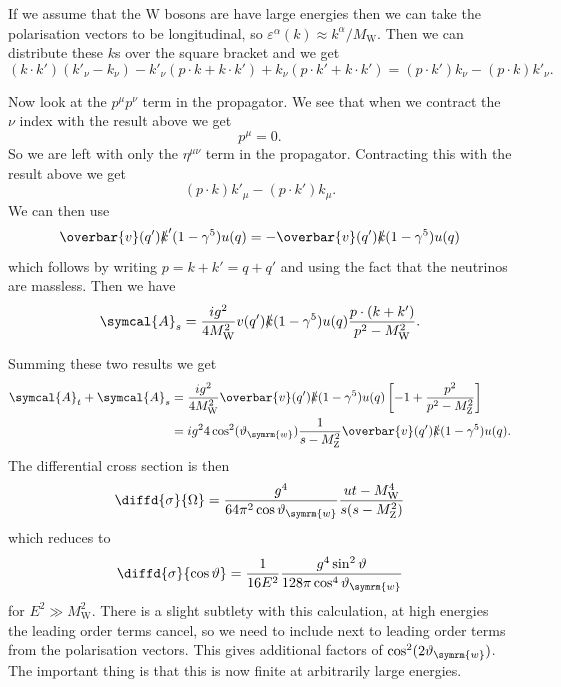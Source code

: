 \documentclass[fleqn]{NotesClass}
\newcommand{\Pparticle}[1]{\mathrm{#1}}
\newcommand{\PZ}{\ensuremath{\Pparticle{Z}}}
\newcommand{\PW}{\ensuremath{\Pparticle{W}}}
\newcommand{\diracadjoint}[1]{\overbar{#1}}
\newcommand{\amplitude}{\symcal{A}}
\newcommand{\minkowskiMetric}{\eta}
\newcommand{\weinbergangle}{\vartheta_{\symrm{w}}}
\begin{document}
    If we assume that the \PW{} bosons are have large energies then we can take the polarisation vectors to be longitudinal, so \(\varepsilon^\alpha(k) \approx k^\alpha/M_{\PW}\).
    Then we can distribute these \(k\)s over the square bracket and we get
    \begin{equation}
        (k \cdot k')(k'_\nu - k_\nu) - k'_\nu(p \cdot k + k \cdot k') + k_\nu(p \cdot k' + k \cdot k') = (p \cdot k')k_\nu - (p \cdot k)k'_\nu.
    \end{equation}
    
    Now look at the \(p^\mu p^\nu\) term in the propagator.
    We see that when we contract the \(\nu\) index with the result above we get
    \begin{equation}
        [(p \cdot k')(k \cdot p) - (p \cdot k)(k' \cdot p)]p^\mu = 0.
    \end{equation}
    So we are left with only the \(\minkowskiMetric^{\mu\nu}\) term in the propagator.
    Contracting this with the result above we get
    \begin{equation}
        (p \cdot k)k'_\mu - (p\cdot k')k_\mu.
    \end{equation}
    We can then use
    \begin{equation}
        \diracadjoint{v}(q')\slashed{k}'(1 - \gamma^5)u(q) = -\diracadjoint{v}(q')\slashed{k}(1 - \gamma^5)u(q)
    \end{equation}
    which follows by writing \(p = k + k' = q + q'\) and using the fact that the neutrinos are massless.
    Then we have
    \begin{equation}
        \amplitude_s = \frac{ig^2}{4M_{\PW}^2} v(q')\slashed{k}(1 - \gamma^5)u(q) \frac{p \cdot (k + k')}{p^2 - M_{\PW}^2}.
    \end{equation}
    
    Summing these two results we get
    \begin{align}
        \amplitude_t + \amplitude_s &= \frac{ig^2}{4M_{\PW}^2} \diracadjoint{v}(q')\slashed{k}(1 - \gamma^5)u(q) \left[ -1 + \frac{p^2}{p^2 - M_{\PZ}^2} \right]\\
        &= ig^24\cos^2(\weinbergangle) \frac{1}{s - M_{\PZ}^2} \diracadjoint{v}(q')\slashed{k}(1 - \gamma^5)u(q).
    \end{align}
    The differential cross section is then
    \begin{equation}
        \diffd{\sigma}{\Omega} = \frac{g^4}{64\pi^2 \cos\weinbergangle} \frac{ut - M_{\PW}^4}{s(s - M_{\PZ}^2)}
    \end{equation}
    which reduces to
    \begin{equation}
        \diffd{\sigma}{\cos\vartheta} = \frac{1}{16E^2} \frac{g^4\sin^2\vartheta}{128\pi\cos^4\weinbergangle}
    \end{equation}
    for \(E^2 \gg M_{\PW}^2\).
    There is a slight subtlety with this calculation, at high energies the leading order terms cancel, so we need to include next to leading order terms from the polarisation vectors.
    This gives additional factors of \(\cos^2(2\weinbergangle)\).
    The important thing is that this is now finite at arbitrarily large energies.
    
\end{document}
